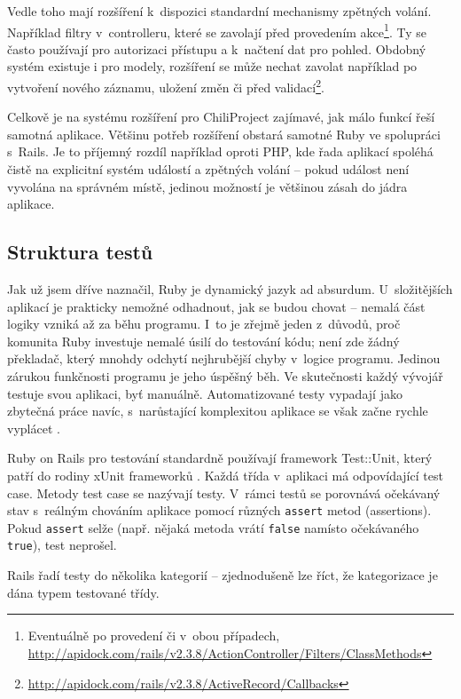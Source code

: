 \documentclass[thesis=B,czech]{FITthesis}[2012/05/02]
\begin{document}
Vedle toho mají rozšíření k~dispozici standardní mechanismy zpětných volání.
Například filtry v~controlleru, které se
zavolají před provedením akce\footnote{Eventuálně po provedení či v~obou
  případech,
  \url{http://apidock.com/rails/v2.3.8/ActionController/Filters/ClassMethods}}. Ty se
často používají pro autorizaci přístupu a k~načtení dat pro
pohled. Obdobný systém existuje i pro modely, rozšíření se může nechat
zavolat například po vytvoření nového záznamu, uložení změn či před
validací\footnote{\url{http://apidock.com/rails/v2.3.8/ActiveRecord/Callbacks}}.

Celkově je na systému rozšíření pro ChiliProject zajímavé, jak málo
funkcí řeší samotná aplikace. Většinu potřeb rozšíření obstará samotné
Ruby ve spolupráci s~Rails. Je to příjemný rozdíl například oproti PHP,
kde řada aplikací spoléhá čistě na explicitní systém událostí
a zpětných volání -- pokud událost není vyvolána na správném místě, jedinou možností je
většinou zásah do jádra aplikace.

\subsection{Struktura testů}
\label{sec:rails_tests}

Jak už jsem dříve naznačil, Ruby je dynamický jazyk ad absurdum.
U~složitějších aplikací je prakticky nemožné odhadnout, jak se budou chovat
-- nemalá část logiky vzniká až za běhu programu. I~to
je zřejmě jeden z~důvodů, proč komunita Ruby investuje nemalé úsilí do
testování kódu; není zde žádný překladač, který mnohdy odchytí nejhrubější chyby
v~logice programu. Jedinou zárukou funkčnosti programu je jeho úspěšný běh.
Ve skutečnosti každý vývojář testuje svou aplikaci, byť manuálně.
Automatizované testy vypadají jako zbytečná práce navíc, s~narůstající
komplexitou aplikace se však začne rychle vyplácet \citep{Rappin2011}.

Ruby on Rails pro testování standardně používají framework Test::Unit,
který patří do rodiny xUnit frameworků \citep{FowlerXunit}. Každá třída
v~aplikaci má odpovídající test case. Metody test case se nazývají
testy. V~rámci testů se porovnává očekávaný stav s~reálným chováním
aplikace pomocí různých \lstinline!assert! metod (assertions). Pokud
\lstinline!assert! selže (např. nějaká metoda vrátí \lstinline!false!
namísto očekávaného \lstinline!true!), test neprošel.

Rails řadí testy do několika kategorií -- zjednodušeně lze říct, že
kategorizace je dána typem testované třídy.
\end{document}
